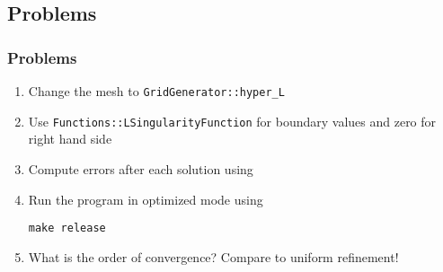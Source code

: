 \subsection{Problems}
\begin{frame}
  \frametitle{Problems}
  \begin{enumerate}
  \item Change the mesh to \lstinline!GridGenerator::hyper_L!
  \item Use \lstinline!Functions::LSingularityFunction! for boundary
    values and zero for right hand side
  \item Compute errors after each solution using
    \begin{block}{}
      
    \end{block}
  \item Run the program in optimized mode using
    \begin{block}{}
      \texttt{make release}
    \end{block}
  \item What is the order of convergence? Compare to uniform refinement!
  \end{enumerate}
\end{frame}


